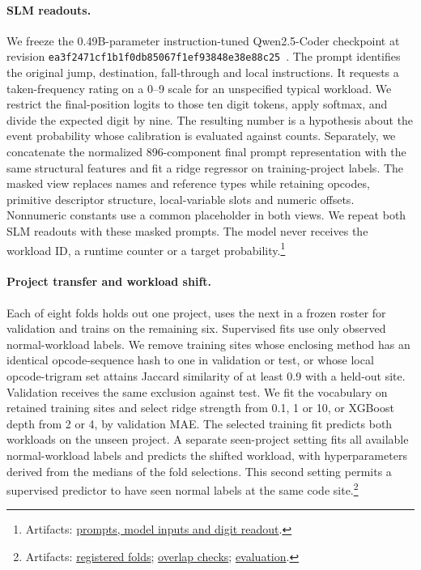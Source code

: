 \documentclass[11pt]{article}
\newcommand{\repocommit}{81d03caebe268d013b3163bcbff31cadabaaec21}
\newcommand{\repourl}{https://github.com/minggu151623/llm_profiling_research}
\newcommand{\repo}[2]{\href{\repourl/blob/\repocommit/#1}{#2}}
\newcommand{\artifacts}[1]{\footnote{Artifacts: #1.}}
\begin{document}
\paragraph{SLM readouts.} We freeze the 0.49B-parameter instruction-tuned Qwen2.5-Coder checkpoint at revision \texttt{ea3f2471cf1b1f0db85067f1ef93848e38e88c25}~\citep{qwen-report,qwen-card}. The prompt identifies the original jump, destination, fall-through and local instructions. It requests a taken-frequency rating on a 0--9 scale for an unspecified typical workload. We restrict the final-position logits to those ten digit tokens, apply softmax, and divide the expected digit by nine. The resulting number is a hypothesis about the event probability whose calibration is evaluated against counts. Separately, we concatenate the normalized 896-component final prompt representation with the same structural features and fit a ridge regressor on training-project labels. The masked view replaces names and reference types while retaining opcodes, primitive descriptor structure, local-variable slots and numeric offsets. Nonnumeric constants use a common placeholder in both views. We repeat both SLM readouts with these masked prompts. The model never receives the workload ID, a runtime counter or a target probability.\artifacts{\repo{ml/slm/README.md}{prompts, model inputs and digit readout}}

\paragraph{Project transfer and workload shift.} Each of eight folds holds out one project, uses the next in a frozen roster for validation and trains on the remaining six. Supervised fits use only observed normal-workload labels. We remove training sites whose enclosing method has an identical opcode-sequence hash to one in validation or test, or whose local opcode-trigram set attains Jaccard similarity of at least 0.9 with a held-out site. Validation receives the same exclusion against test. We fit the vocabulary on retained training sites and select ridge strength from 0.1, 1 or 10, or XGBoost depth from 2 or 4, by validation MAE. The selected training fit predicts both workloads on the unseen project. A separate seen-project setting fits all available normal-workload labels and predicts the shifted workload, with hyperparameters derived from the medians of the fold selections. This second setting permits a supervised predictor to have seen normal labels at the same code site.\artifacts{\repo{experiments/study/config.json}{registered folds}; \repo{ml/study_data.py}{overlap checks}; \repo{ml/evaluate.py}{evaluation}}
\end{document}
